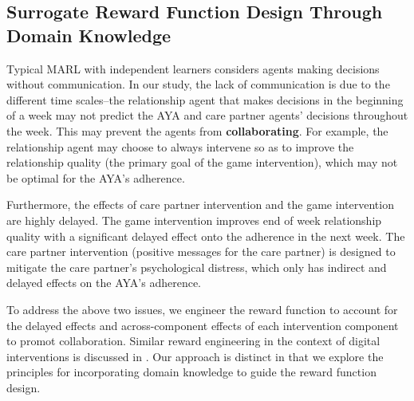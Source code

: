 

\subsection{Surrogate Reward Function Design Through Domain Knowledge}


Typical MARL \cite{oroojlooy2023review} with independent learners considers agents making decisions without communication. In our study, the lack of communication is due to the different time scales--the relationship agent that makes decisions in the beginning of a week may not predict the AYA and care partner agents' decisions throughout the week. This may prevent the agents from \textbf{collaborating}. For example, the relationship agent may choose to always intervene so as to improve the relationship quality (the primary goal of the game intervention), which may not be optimal for the AYA's adherence.

Furthermore, the effects of care partner intervention and the game intervention are highly delayed. The game intervention improves end of week relationship quality with a significant delayed effect onto the adherence in the next week.
The care partner intervention (positive messages for the care partner) is designed to mitigate the care partner's psychological distress, which only has indirect and delayed effects on the AYA's adherence. 

To address the above two issues, we engineer the reward function to account for the delayed effects and across-component effects of each intervention component to promot collaboration. Similar reward engineering in the context of digital interventions is discussed in \cite{trella2023reward}. Our approach is distinct in that we explore the principles for incorporating domain knowledge to guide the reward function design.

